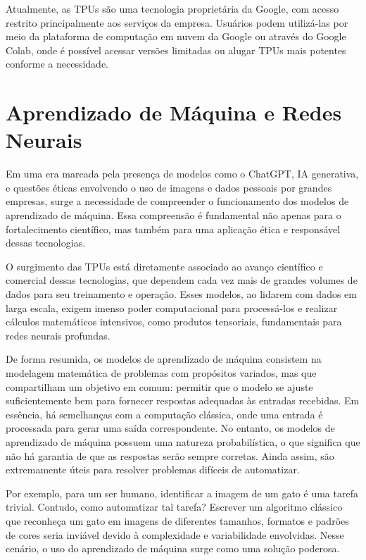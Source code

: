 \documentclass{report}
\begin{document}
Atualmente, as TPUs são uma tecnologia proprietária da Google, com acesso restrito principalmente aos serviços da empresa. Usuários podem utilizá-las por meio da plataforma de computação em nuvem da Google ou através do Google Colab, onde é possível acessar versões limitadas ou alugar TPUs mais potentes conforme a necessidade.

\section{Aprendizado de Máquina e Redes Neurais}

\setlength{\parskip}{1em}\hspace{0.5cm} Em uma era marcada pela presença de modelos como o ChatGPT, IA generativa, e questões éticas envolvendo o uso de imagens e dados pessoais por grandes empresas, surge a necessidade de compreender o funcionamento dos modelos de aprendizado de máquina. Essa compreensão é fundamental não apenas para o fortalecimento científico, mas também para uma aplicação ética e responsável dessas tecnologias.

O surgimento das TPUs está diretamente associado ao avanço científico e comercial dessas tecnologias, que dependem cada vez mais de grandes volumes de dados para seu treinamento e operação. Esses modelos, ao lidarem com dados em larga escala, exigem imenso poder computacional para processá-los e realizar cálculos matemáticos intensivos, como produtos tensoriais, fundamentais para redes neurais profundas.

De forma resumida, os modelos de aprendizado de máquina consistem na modelagem matemática de problemas com propósitos variados, mas que compartilham um objetivo em comum: permitir que o modelo se ajuste suficientemente bem para fornecer respostas adequadas às entradas recebidas. Em essência, há semelhanças com a computação clássica, onde uma entrada é processada para gerar uma saída correspondente. No entanto, os modelos de aprendizado de máquina possuem uma natureza probabilística, o que significa que não há garantia de que as respostas serão sempre corretas. Ainda assim, são extremamente úteis para resolver problemas difíceis de automatizar.

Por exemplo, para um ser humano, identificar a imagem de um gato é uma tarefa trivial. Contudo, como automatizar tal tarefa? Escrever um algoritmo clássico que reconheça um gato em imagens de diferentes tamanhos, formatos e padrões de cores seria inviável devido à complexidade e variabilidade envolvidas. Nesse cenário, o uso do aprendizado de máquina surge como uma solução poderosa.
\end{document}
